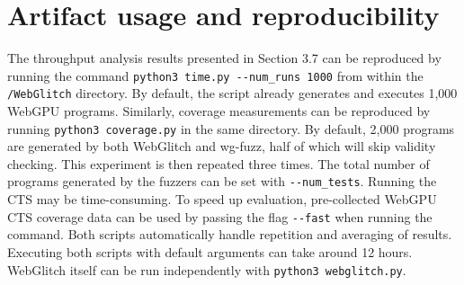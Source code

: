 \documentclass[a4paper,UKenglish]{darts-v2021}
\begin{document}
\appendix
\section{Artifact usage and reproducibility}
The throughput analysis results presented in Section 3.7 can be reproduced by running the command \texttt{python3 time.py -{}-num\_runs 1000} from within the \texttt{/WebGlitch} directory.
By default, the script already generates and executes 1,000 WebGPU programs.
Similarly, coverage measurements can be reproduced by running \texttt{python3 coverage.py} in the same directory.
By default, 2,000 programs are generated by both WebGlitch and wg-fuzz, half of which will skip validity checking.
This experiment is then repeated three times.
The total number of programs generated by the fuzzers can be set with \texttt{-{}-num\_tests}.
Running the CTS may be time-consuming. To speed up evaluation, pre-collected WebGPU CTS coverage data can be used by passing the flag \texttt{-{}-fast} when running the command.
Both scripts automatically handle repetition and averaging of results.
Executing both scripts with default arguments can take around 12 hours.
WebGlitch itself can be run independently with \texttt{python3 webglitch.py}. 






\end{document}
